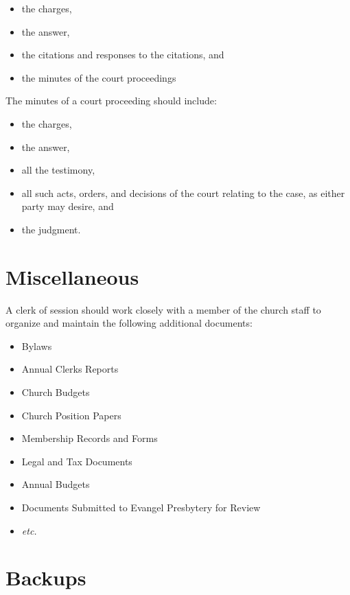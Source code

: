 \documentclass[
]{book}
\providecommand{\tightlist}{%
  \setlength{\itemsep}{0pt}\setlength{\parskip}{0pt}}
\begin{document}
\begin{itemize}
\tightlist
\item
  the charges,
\item
  the answer,
\item
  the citations and responses to the citations, and
\item
  the minutes of the court proceedings
\end{itemize}

The minutes of a court proceeding should include:

\begin{itemize}
\tightlist
\item
  the charges,
\item
  the answer,
\item
  all the testimony,
\item
  all such acts, orders, and decisions of the court relating to the case, as either party may desire, and
\item
  the judgment.
\end{itemize}

\hypertarget{miscellaneous}{%
\section{Miscellaneous}\label{miscellaneous}}

A clerk of session should work closely with a member of the church staff to organize and maintain the following additional documents:

\begin{itemize}
\tightlist
\item
  Bylaws
\item
  Annual Clerks Reports
\item
  Church Budgets
\item
  Church Position Papers
\item
  Membership Records and Forms
\item
  Legal and Tax Documents
\item
  Annual Budgets
\item
  Documents Submitted to Evangel Presbytery for Review
\item
  \emph{etc.}
\end{itemize}

\hypertarget{backups}{%
\section{Backups}\label{backups}}
\end{document}
